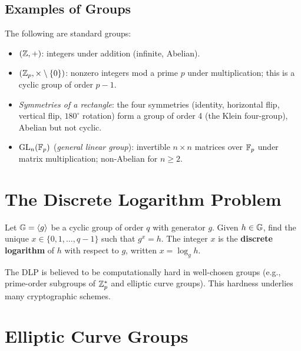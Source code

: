 \documentclass[11pt]{article}
\begin{document}
\subsection{Examples of Groups}

\begin{example}
  The following are standard groups:
  \begin{itemize}
    \item $(\mathbb{Z}, +)$: integers under addition (infinite, Abelian).
    \item $(\mathbb{Z}_p, \times \setminus \{0\})$: nonzero integers mod a prime
      $p$ under multiplication; this is a cyclic group of order $p-1$.
    \item \emph{Symmetries of a rectangle}: the four symmetries
      (identity, horizontal flip, vertical flip, $180^\circ$ rotation)
      form a group of order 4 (the Klein four-group), Abelian but not
      cyclic.
    \item $\mathrm{GL}_n(\mathbb{F}_p)$ (\emph{general linear group}): invertible
      $n \times n$ matrices over $\mathbb{F}_p$ under matrix multiplication; non-Abelian
      for $n \geq 2$.
  \end{itemize}
\end{example}

\section{The Discrete Logarithm Problem}

\begin{definition}
  Let $\mathbb{G} = \langle g \rangle$ be a cyclic group of order $q$ with
  generator $g$.  Given $h \in \mathbb{G}$, find the unique $x \in
  \{0, 1, \ldots, q-1\}$ such that $g^x = h$.  The integer $x$ is the
  \textbf{discrete logarithm} of $h$ with respect to $g$, written
  $x = \log_g h$.
\end{definition}

The DLP is believed to be computationally hard in well-chosen groups
(e.g., prime-order subgroups of $\mathbb{Z}_p^*$ and elliptic curve groups).
This hardness underlies many cryptographic schemes.

\section{Elliptic Curve Groups}
\end{document}
